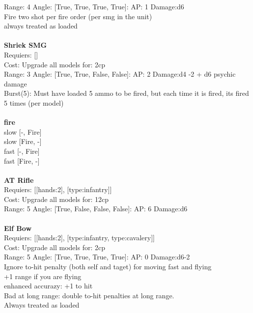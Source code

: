 Range: 4  Angle: [True, True, True, True]: AP: 1 Damage:d6 \\
Fire two shot per fire order (per smg in the unit)\\ 
always treated as loaded\\ 








\ \\
{\bf Shriek SMG } \\

Requiers: [] \\
Cost: Upgrade all models for: 2cp \\


Range: 3  Angle: [True, True, False, False]: AP: 2 Damage:d4 -2 + d6 psychic damage \\
Burst(5): Must have loaded 5 ammo to be fired, but each time it is fired, its fired 5 times (per model)\\ 







\ \\ {\bf fire } \\
slow [-, Fire] \\
slow [Fire, -] \\
fast [-, Fire] \\
fast [Fire, -] \\

\ \\
{\bf AT Rifle } \\

Requiers: [[hands:2], [type:infantry]] \\
Cost: Upgrade all models for: 12cp \\


Range: 5  Angle: [True, False, False, False]: AP: 6 Damage:d6 \\








\ \\
{\bf Elf Bow } \\

Requiers: [[hands:2], [type:infantry, type:cavalery]] \\
Cost: Upgrade all models for: 2cp \\


Range: 5  Angle: [True, True, True, True]: AP: 0 Damage:d6-2 \\
Ignore to-hit penalty (both self and taget) for moving fast and flying\\ 
+1 range if you are flying\\ 
enhanced accurazy: +1 to hit\\ 
Bad at long range: double to-hit penalties at long range.\\ 
Always treated as loaded\\ 









